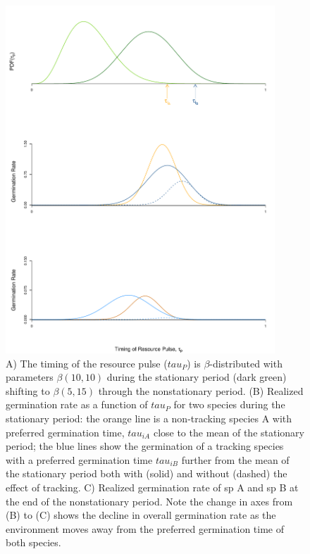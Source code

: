 \documentclass[11pt,letterpaper]{article}
\begin{document}
\begin{figure}[t!]
\centering
\includegraphics[width=0.9\textwidth]{..//..//figures/TauP_Germination_20190909.pdf} 
\caption{A) The timing of the resource pulse ($tau_P$) is $\beta$-distributed with parameters $\beta(10,10)$ during the stationary period (dark green) shifting to $\beta (5,15)$ through the nonstationary period.  (B) Realized germination rate as a function of $tau_P$ for two species during the stationary period:  the orange line is a non-tracking species A with preferred germination time, $tau_{iA}$ close to the mean of the stationary period; the blue lines show the germination of a tracking species with a preferred germination time $tau_{iB}$ further from the mean of the stationary period both with (solid) and without (dashed) the effect of tracking.  C) Realized germination rate of sp A and sp B at the end of the nonstationary period.  Note the change in axes from (B) to (C) shows the decline in overall germination rate as the environment moves away from the preferred germination time of both species.} %
 \label{fig:concept}
\end{figure}
\end{document}
